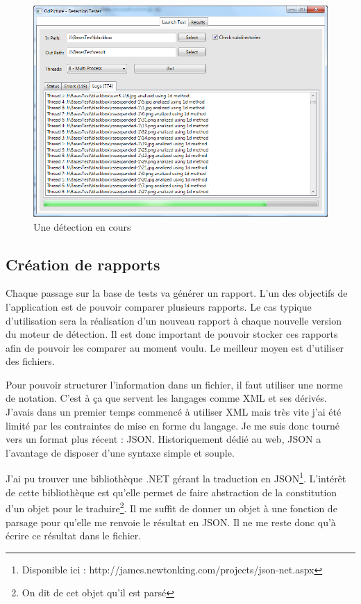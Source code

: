 \begin{figure}
\begin{center}
\includegraphics[scale=0.5]{images/projet1DetectionWindow.png}
\end{center}
\caption{Une détection en cours}
\end{figure}

\subsection{Création de rapports}

Chaque passage sur la base de tests va générer un rapport. L'un des objectifs de l'application est de pouvoir comparer plusieurs rapports. Le cas typique d'utilisation sera la réalisation d'un nouveau rapport à chaque nouvelle version du moteur de détection. Il est donc important de pouvoir stocker ces rapports afin de pouvoir les comparer au moment voulu. Le meilleur moyen est d'utiliser des fichiers.

Pour pouvoir structurer l'information dans un fichier, il faut utiliser une norme de notation. C'est à ça que servent les langages comme XML et ses dérivés. J'avais dans un premier temps commencé à utiliser XML mais très vite j'ai été limité par les contraintes de mise en forme du langage. Je me suis donc tourné vers un format plus récent : JSON. Historiquement dédié au web, JSON a l'avantage de disposer d'une syntaxe simple et souple.

J'ai pu trouver une bibliothèque .NET gérant la traduction en JSON\footnote{Disponible ici : http://james.newtonking.com/projects/json-net.aspx}. L'intérêt de cette bibliothèque est qu'elle permet de faire abstraction de la constitution d'un objet pour le traduire\footnote{On dit de cet objet qu'il est \og parsé \fg{} }. Il me suffit de donner un objet à une fonction de parsage pour qu'elle me renvoie le résultat en JSON. Il ne me reste donc qu'à écrire ce résultat dans le fichier.

